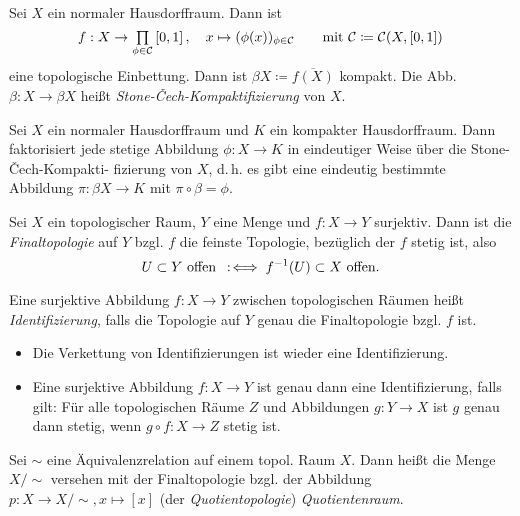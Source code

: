 \documentclass{cheat-sheet}
\begin{document}

\begin{defn}
  Sei $X$ ein normaler Hausdorffraum. Dann ist
  \[
    f : X \to \prod_{\phi \in \mathcal{C}} \cinterval{0}{1}, \quad x \mapsto (\phi(x))_{\phi \in \mathcal{C}}
    \qquad \text{mit } \mathcal{C} \coloneqq \mathcal{C}(X, \cinterval{0}{1})
  \]
  eine topologische Einbettung. Dann ist $\beta X \coloneqq \overline{f(X)}$ kompakt. Die Abb. $\beta : X \to \beta X$ heißt \emph{Stone-Čech-Kompaktifizierung} von $X$.
\end{defn}

\begin{prop}
  Sei $X$ ein normaler Hausdorffraum und $K$ ein kompakter Hausdorffraum. Dann faktorisiert jede stetige Abbildung $\phi : X \to K$ in eindeutiger Weise über die Stone-Čech-Kompakti- fizierung von $X$, d.\,h. es gibt eine eindeutig bestimmte Abbildung $\pi : \beta X \to K$ mit $\pi \circ \beta = \phi$.
\end{prop}

\begin{defn}
  Sei $X$ ein topologischer Raum, $Y$ eine Menge und $f : X \to Y$ surjektiv. Dann ist die \emph{Finaltopologie} auf $Y$ bzgl. $f$ die feinste Topologie, bezüglich der $f$ stetig ist, also
  \[ U \subset Y \text{ offen} \enspace:\!\iff f^{-1}(U) \subset X \text{ offen}. \]
\end{defn}

\begin{defn}
  Eine surjektive Abbildung $f : X \to Y$ zwischen topologischen Räumen heißt \emph{Identifizierung}, falls die Topologie auf $Y$ genau die Finaltopologie bzgl. $f$ ist.
\end{defn}

\begin{prop}
  \begin{itemize}
    \item Die Verkettung von Identifizierungen ist wieder eine Identifizierung.
    \item Eine surjektive Abbildung $f : X  \to Y$ ist genau dann eine Identifizierung, falls gilt: Für alle topologischen Räume $Z$ und Abbildungen $g : Y \to X$ ist $g$ genau dann stetig, wenn $g \circ f : X \to Z$ stetig ist.
  \end{itemize}
\end{prop}

\begin{defn}
  Sei ${\sim}$ eine Äquivalenzrelation auf einem topol. Raum $X$. Dann heißt die Menge $X/{\sim}$ versehen mit der Finaltopologie bzgl. der Abbildung $p : X \to X/{\sim}, x \mapsto [x]$ (der \emph{Quotientopologie}) \emph{Quotientenraum}.
\end{defn}
\end{document}
